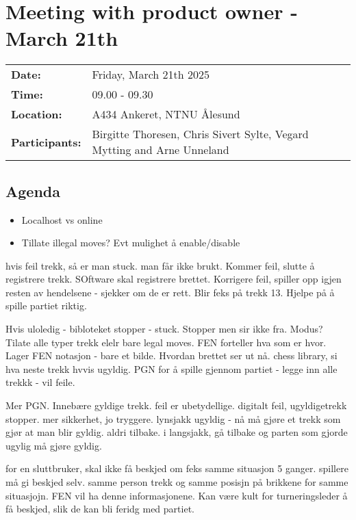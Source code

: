 \section{Meeting with product owner - March 21th}
\begin{tabular}{ll}
    \textbf{Date:} & Friday, March 21th 2025 \\
    \textbf{Time:} & 09.00 - 09.30\\
    \textbf{Location:} & A434 Ankeret, NTNU Ålesund \\
    \textbf{Participants:} & Birgitte Thoresen, Chris Sivert Sylte, Vegard Mytting and Arne Unneland\\
\end{tabular}

\vspace{0.5cm}

\subsection{Agenda}

\begin{itemize}
    \item Localhost vs online
    \item Tillate illegal moves? Evt mulighet å enable/disable
\end{itemize}

hvis feil trekk, så er man stuck. man får ikke brukt. Kommer feil, slutte å registrere trekk. SOftware skal registrere brettet. Korrigere feil, spiller opp igjen resten av hendelsene - sjekker om de er rett. Blir feks på trekk 13. Hjelpe på å spille partiet riktig.

Hvis uloledig - bibloteket stopper - stuck. Stopper men sir ikke fra. Modus? Tilate alle typer trekk elelr bare legal moves. FEN forteller hva som er hvor. Lager FEN notasjon - bare et bilde. Hvordan brettet ser ut nå. chess library, si hva neste trekk hvvis ugyldig. PGN for å spille gjennom partiet - legge inn alle trekkk - vil feile. 

Mer PGN. Innebære gyldige trekk. feil er ubetydellige. digitalt feil, ugyldigetrekk stopper. mer sikkerhet, jo tryggere. lynsjakk ugyldig - nå må gjøre et trekk som gjør at man blir gyldig. aldri tilbake. i langsjakk, gå tilbake og parten som gjorde ugylig må gjøre gyldig. 

for en sluttbruker, skal ikke få beskjed om feks samme situasjon 5 ganger. spillere må gi beskjed selv. samme person trekk og samme posisjn på brikkene for samme situasjojn. FEN vil ha denne informasjonene. Kan være kult for turneringsleder å få beskjed, slik de kan bli feridg med partiet. 

